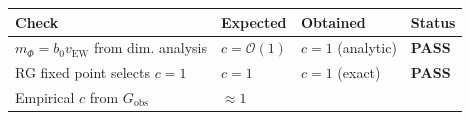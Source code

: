 \documentclass[
  11pt,
]{article}
\begin{document}
\begin{longtable}[]{@{}llll@{}}
\toprule
\begin{minipage}[b]{0.22\columnwidth}\raggedright
Check\strut
\end{minipage} & \begin{minipage}[b]{0.22\columnwidth}\raggedright
Expected\strut
\end{minipage} & \begin{minipage}[b]{0.22\columnwidth}\raggedright
Obtained\strut
\end{minipage} & \begin{minipage}[b]{0.22\columnwidth}\raggedright
Status\strut
\end{minipage}\tabularnewline
\midrule
\endhead
\begin{minipage}[t]{0.22\columnwidth}\raggedright
\(m_\Phi = b_0 v_\text{EW}\) from dim. analysis\strut
\end{minipage} & \begin{minipage}[t]{0.22\columnwidth}\raggedright
\(c = \mathcal{O}(1)\)\strut
\end{minipage} & \begin{minipage}[t]{0.22\columnwidth}\raggedright
\(c = 1\) (analytic)\strut
\end{minipage} & \begin{minipage}[t]{0.22\columnwidth}\raggedright
\textbf{PASS}\strut
\end{minipage}\tabularnewline
\begin{minipage}[t]{0.22\columnwidth}\raggedright
RG fixed point selects \(c = 1\)\strut
\end{minipage} & \begin{minipage}[t]{0.22\columnwidth}\raggedright
\(c = 1\)\strut
\end{minipage} & \begin{minipage}[t]{0.22\columnwidth}\raggedright
\(c = 1\) (exact)\strut
\end{minipage} & \begin{minipage}[t]{0.22\columnwidth}\raggedright
\textbf{PASS}\strut
\end{minipage}\tabularnewline
\begin{minipage}[t]{0.22\columnwidth}\raggedright
Empirical \(c\) from \(G_\text{obs}\)\strut
\end{minipage} & \begin{minipage}[t]{0.22\columnwidth}\raggedright
\(\approx 1\)\strut
\end{minipage} & \begin{minipage}[t]{0.22\columnwidth}\raggedright

\end{minipage}
\end{longtable}
\end{document}
